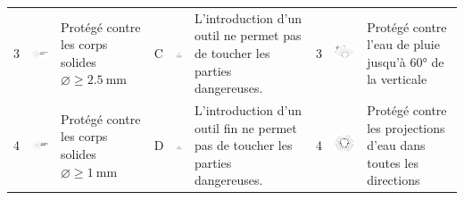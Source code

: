 \begin{landscape}
\begin{xltabular}{\linewidth}{p{0.3cm} m{2cm} X p{0.3cm} m{2cm} X p{0.3cm} m{2.2cm} X}
3 		& 	\includegraphics[scale=1.1]{3X.png} & Protégé contre les corps solides $\diameter \geq \SI{2,5}{\milli\meter}$  	& C	& \includegraphics[width=2cm]{C.png}	&	L'introduction d'un outil ne permet pas de toucher les parties dangereuses. & 3 & 	\includegraphics[scale=1.1]{X3.png}	&	Protégé contre l'eau de pluie jusqu'à 60° de la verticale \\
4 		& 	\includegraphics[scale=1.1]{4X.png} & Protégé contre les corps solides $\diameter \geq \SI{1}{\milli\meter}$  	& D	& \includegraphics[width=2cm]{D.png}	&	L'introduction d'un outil fin ne permet pas de toucher les parties dangereuses. & 4 & 	\includegraphics[scale=1.1]{X4.png}	&	Protégé contre les projections d'eau dans toutes les directions \\

\end{xltabular}
\end{landscape}
